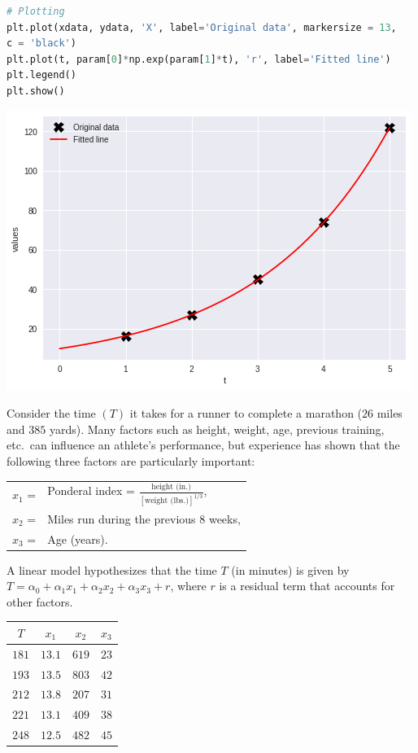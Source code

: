 \documentclass[10pt]{exam}
\begin{document}
\begin{questions}
\begin{lstlisting}[language=Python]
# Plotting
plt.plot(xdata, ydata, 'X', label='Original data', markersize = 13,
c = 'black')
plt.plot(t, param[0]*np.exp(param[1]*t), 'r', label='Fitted line')
plt.legend()
plt.show()
\end{lstlisting}
\begin{center}
\includegraphics[scale = 0.5]{Boring.png}
\end{center}
\question [10] Consider the time $(T)$ it takes for a runner to complete a marathon ($26$ miles and $385$ yards). Many factors such as height, weight, age, previous training, etc.\ can influence an athlete's performance, but experience has shown that the following three factors are particularly important:
\begin{center}
\begin{tabular}{ll}
$x_1$ = & Ponderal index  = $\frac{\text{height (in.)}}{[\text{weight (lbs.)}]^{1/3}}$, \\
$x_2$ = & Miles run during  the  previous $8$ weeks,\\ 
$x_3$ = & Age (years).
\end{tabular}
\end{center}
A linear model hypothesizes that the time $T$ (in minutes) is given by $T = \alpha_0 +\alpha_1x_1 +\alpha_2x_2 +\alpha_3x_3 +r$, where $r$ is a residual term that accounts for other factors.
\begin{center}
\begin{tabular}{c|ccc}
$T$ & $x_1$ & $x_2$ & $x_3$ \\ \hline
$181$ &  $13.1$ & $619$ & $23$ \\
$193$ & $13.5$ & $803$ & $42$ \\ 
$212$ & $13.8$ & $207$ & $31$ \\ 
$221$ & $13.1$ & $409$ & $38$ \\
$248$ & $12.5$ & $482$ & $45$
\end{tabular}
\end{center}



\end{questions}
\end{document}
